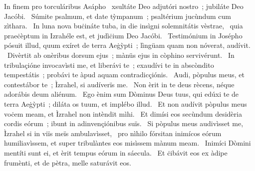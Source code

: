 { In finem pro torculáribus Asápho}
{%
~xsultáte Deo adjutóri nostro~; jubiláte Deo Jacóbi. 
~Súmite psalmum, et date tỳmpanum~; psaltérium jucùndum cum zìthara. 
~In luna nova buċináte tuba, in die insìgni solemnitátis vèstrae, 
~quia praeċèptum in Izrahéle est, et judìċium Deo Jacóbi. 
~Testimónium in Josépho pósuit illud, quum exíret de terra Aeġỳpti~; lìngüam quam non nóverat, audívit. 
~Divèrtit ab onèribus dorsum ejus~; mànüs ejus in còphino servivérunt. 
~In tribulaçióne invocavìsti me, et liberávi te~; exaudívi te in abscòndito tempestátis~; probávi te àpud aquam contradicçiónis. 
~Audi, pòpulus meus, et contestábor te~; Ìzrahel, si audíverïs me. 
~Non èrit in te deus rècens, néque adorábis deum aliénum. 
~Ego ènim sum Dòminus Deus tuus, qui edúxi te de terra Aeġỳpti~; diláta os tuum, et implébo illud. 
~Et non audívit pòpulus meus voċem meam, et Ìzrahel non intèndit mìhi. 
~Et dimísi eos secùndum desidèria cordis eórum~; ibunt in adinvençiónibus suïs. 
~Si pòpulus meus audivìsset me, Ìzrahel si in viïs meïs ambulavìsset, 
~pro nìhilo fórsitan inimícos eórum humiliavìssem, et super tribulàntes eos misìssem mànum meam. 
~Inimíci Dòmini mentíti sunt ei, et èrit tempus eórum in sáecula. 
~Et ċibávit eos ex àdipe frumènti, et de pètra, melle saturávit eos. 
}
